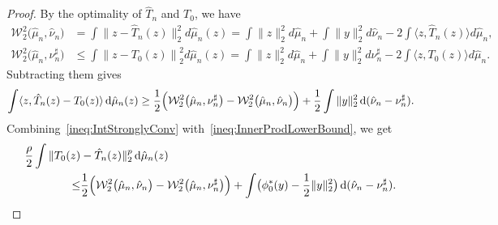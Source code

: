 \documentclass[11pt]{article}
\begin{document}
\begin{proof}
By the optimality of $\hat T_n$ and $T_0$, we have 
\begin{align*} 
\mathcal{W}_2^2\bigl(\hat{\mu}_n, \hat{\nu}_n\bigr) & =\int\|z-\hat{T}_n(z)\|_2^2 d \hat{\mu}_n(z)=\int\|z\|_2^2 d \hat{\mu}_n+\int\|y\|_2^2 d \hat{\nu}_n-2 \int\langle z, \hat{T}_n(z)\rangle d \hat{\mu}_n, \\ 
\mathcal{W}_2^2\bigl(\hat{\mu}_n, \nu_n^{\sharp}\bigr) & \leq \int\left\|z-T_0(z)\right\|_2^2 d \hat{\mu}_n(z)=\int\|z\|_2^2 d \hat{\mu}_n+\int\|y\|_2^2 d \nu_n^{\sharp}-2 \int\langle z, T_0(z)\rangle d \hat{\mu}_n.
\end{align*}
Subtracting them gives
\begin{align}
\int \langle z ,\hat T_n(z) - T_0(z) \rangle  \, \mathrm{d}\hat \mu_n(z) \geq \frac{1}{2}\Bigl(\mathcal{W}_2^2\bigl(\hat{\mu}_n, \nu_n^{\sharp}\bigr)  - \mathcal{W}_2^2\bigl(\hat{\mu}_n, \hat{\nu}_n\bigr)\Bigr) + \frac{1}{2}\int \|y\|_2^2 \, \mathrm{d}(\hat\nu_n -\nu_n^{\sharp} ).  \label{ineq:InnerProdLowerBound}
\end{align}
Combining~\eqref{ineq:IntStronglyConv} with~\eqref{ineq:InnerProdLowerBound}, we get 
\begin{align}
\frac{\rho}{2} \int \|T_0(z) &- \hat T_n(z)\|_2^{p}  \, \mathrm{d}\hat \mu_n(z) \notag \\
\leq& \frac{1}{2}\Bigl(\mathcal{W}_2^2\bigl(\hat{\mu}_n, \hat{\nu}_n\bigr) - \mathcal{W}_2^2\bigl(\hat{\mu}_n, \nu_n^{\sharp}\bigr)\Bigr) + \int \bigl(\phi_0^*(y)-\frac{1}{2}\|y\|_2^2 \bigr) \, \mathrm{d}(\hat\nu_n - \nu_n^{\sharp}). \label{ineq:EmpOTUpperBound}
\end{align}


\end{proof}
\end{document}

